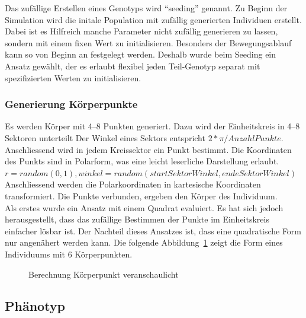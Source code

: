         Das zufällige Erstellen eines Genotyps wird ``seeding'' genannt.
        Zu Beginn der Simulation wird die initale Population mit zufällig generierten Individuen erstellt.
        Dabei ist es Hilfreich manche Parameter nicht zufällig generieren zu lassen,
        sondern mit einem fixen Wert zu initialisieren.
        Besonders der Bewegungsablauf kann so von Beginn an festgelegt werden.
        Deshalb wurde beim Seeding ein Ansatz gewählt, der es erlaubt flexibel jeden Teil-Genotyp separat mit
        spezifizierten Werten zu initialisieren.

      \subsubsection{Generierung Körperpunkte\label{subsub:GenotypGenerierungKörperpunkte}}

        Es werden Körper mit 4--8 Punkten generiert.
        Dazu wird der Einheitskreis in 4--8 Sektoren unterteilt
        Der Winkel eines Sektors entspricht \( 2 * \pi / Anzahl Punkte\).
        \\
        Anschliessend wird in jedem Kreissektor ein Punkt bestimmt.
        Die Koordinaten des Punkts sind in Polarform, was eine leicht leserliche Darstellung erlaubt.
        \\
        \( r = random (0, 1), winkel = random(startSektorWinkel, endeSektorWinkel) \)
        Anschliessend werden die Polarkoordinaten in kartesische Koordinaten transformiert.
        Die Punkte verbunden, ergeben den Körper des Individuum.
        \\
        Als erstes wurde ein Ansatz mit einem Quadrat evaluiert.
        Es hat sich jedoch herausgestellt,
        dass das zufällige Bestimmen der Punkte im Einheitskreis einfacher lösbar ist.
        Der Nachteil dieses Ansatzes ist, dass eine quadratische Form nur angenähert werden kann.
        Die folgende Abbildung~\ref{fig:kp} zeigt die Form eines Individuums mit 6 Körperpunkten.
        \\
        \begin{figure}[H]
          
          \caption{Berechnung Körperpunkt veranschaulicht\label{fig:kp}}
        \end{figure}

    \subsection{Phänotyp\label{sub:Phenotyp}}

